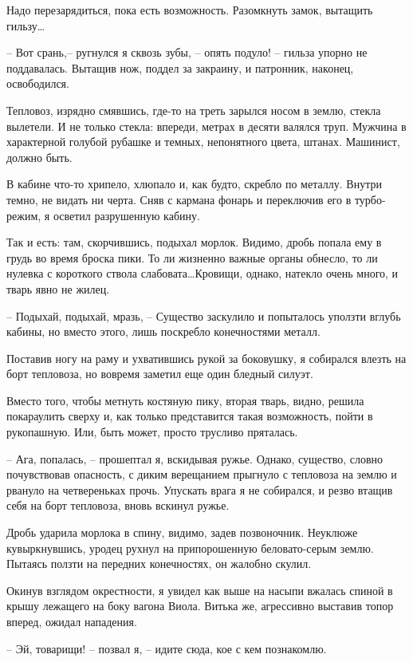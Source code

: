 \documentclass[a4paper]{book}
\begin{document}
Надо перезарядиться, пока есть возможность. Разомкнуть замок, вытащить гильзу\ldots 

-- Вот срань,-- ругнулся я сквозь зубы, -- опять подуло! -- гильза упорно не поддавалась. Вытащив нож, поддел за закраину, и патронник, наконец, освободился.

Тепловоз, изрядно смявшись, где-то на треть зарылся носом в землю, стекла вылетели. И не только стекла: впереди, метрах в десяти валялся труп. Мужчина в характерной голубой рубашке и темных, непонятного цвета, штанах. Машинист, должно быть. 

В кабине что-то хрипело, хлюпало и, как будто, скребло по металлу. Внутри темно, не видать ни черта. Сняв с кармана фонарь и переключив его в турбо-режим, я осветил разрушенную кабину. 

Так и есть: там, скорчившись, подыхал морлок. Видимо, дробь попала ему в грудь во время броска пики. То ли жизненно важные органы обнесло, то ли нулевка с короткого ствола слабовата\ldots Кровищи, однако, натекло очень много, и тварь явно не жилец.

-- Подыхай, подыхай, мразь, --  Существо заскулило и попыталось уползти вглубь кабины, но вместо этого, лишь поскребло конечностями металл. 

Поставив ногу на раму и ухватившись рукой за боковушку, я собирался влезть на борт тепловоза, но вовремя заметил еще один бледный силуэт. 

Вместо того, чтобы метнуть костяную пику, вторая тварь, видно, решила покараулить сверху и, как только представится такая возможность, пойти в рукопашную. Или, быть может, просто трусливо пряталась.  

-- Ага, попалась, -- прошептал я, вскидывая ружье. Однако, существо, словно почувствовав опасность, с диким верещанием прыгнуло с тепловоза на землю и рвануло на четвереньках прочь. Упускать врага я не собирался, и резво втащив себя на борт тепловоза, вновь вскинул ружье. 

Дробь ударила морлока в спину, видимо, задев позвоночник. Неуклюже кувыркнувшись, уродец рухнул на припорошенную беловато-серым землю. Пытаясь ползти на передних конечностях, он жалобно скулил.

Окинув взглядом окрестности, я увидел как выше на насыпи вжалась спиной в крышу лежащего на боку вагона Виола. Витька же, агрессивно выставив топор вперед, ожидал нападения.

-- Эй, товарищи! -- позвал я, -- идите сюда, кое с кем познакомлю. 
\end{document}
